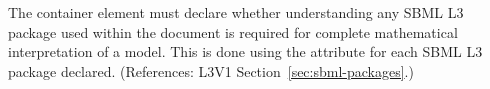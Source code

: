 The  container element must declare 
whether understanding any SBML L3 package used
within the document is required for complete 
mathematical interpretation of a model.  This 
is done using the  attribute 
for each SBML L3 package declared.  (References: 
L3V1 Section~\ref{sec:sbml-packages}.)

